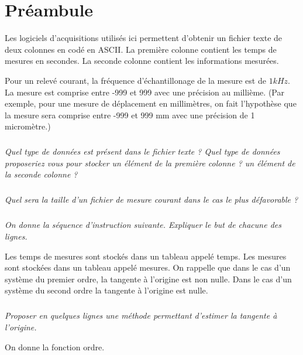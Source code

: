 \documentclass[10pt]{article}
\begin{document}




 \renewcommand{\baselinestretch}{1.2}
\setlength{\parskip}{2ex plus 0.5ex minus 0.2ex}



\section{Préambule}
Les logiciels d'acquisitions utilisés ici permettent d'obtenir un fichier texte de deux colonnes en codé en ASCII. La première colonne contient les temps de mesures en secondes. La seconde colonne contient les informations mesurées. 

Pour un relevé courant, la fréquence d'échantillonage de la mesure est de $1 kHz$. La mesure est comprise entre -999 et 999 avec une précision au millième. (Par exemple, pour une mesure de déplacement en millimètres, on fait l'hypothèse que la mesure sera comprise entre -999 et 999 mm avec une précision de 1 micromètre.)


\subparagraph{}
\textit{Quel type de données est présent dans le fichier texte ? Quel type de données proposeriez vous pour stocker un élément de la première colonne ? un élément de la seconde colonne ?}

\subparagraph{}
\textit{Quel sera la taille d'un fichier de mesure courant dans le cas le plus défavorable ?}

\subparagraph{}
\textit{On donne la séquence d'instruction suivante. Expliquer le but de chacune des lignes.}
\begin{py}
\begin{python}
\end{python}
\end{py}

Les temps de mesures sont stockés dans un tableau appelé \textsf{temps}. Les mesures sont stockées dans un tableau appelé \textsf{mesures}. On rappelle que dans le cas d'un système du premier ordre, la tangente à l'origine est non nulle. Dans le cas d'un système du second ordre la tangente à l'origine est nulle.


\subparagraph{}
\textit{Proposer en quelques lignes une méthode permettant d'estimer la tangente à l'origine.}
 
 
 On donne la fonction \textsf{ordre}. 
\begin{py}
\begin{python}
\end{python}
\end{py}
 
\end{document}
